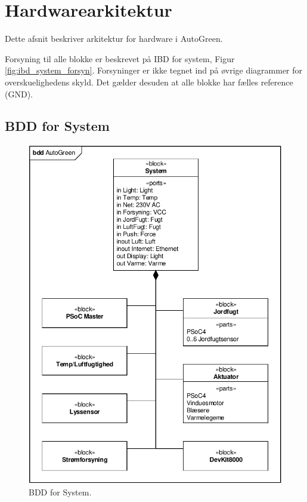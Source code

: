 \section{Hardwarearkitektur}
Dette afsnit beskriver arkitektur for hardware i AutoGreen.

Forsyning til alle blokke er beskrevet på IBD for system, Figur \ref{fig:ibd_system_forsyn}. Forsyninger er ikke tegnet ind på øvrige diagrammer for overskuelighedens skyld. Det gælder desuden at alle blokke har fælles reference (GND). 

\clearpage

\subsection{BDD for System}
\begin{figure}[h]
\centering 
\includegraphics[width={\textwidth-2cm}, trim=0 0 0 0, clip=true] {../fig/bdd_system.pdf}
\caption{BDD for System.}
\label{fig:bdd_system}
\end{figure}

